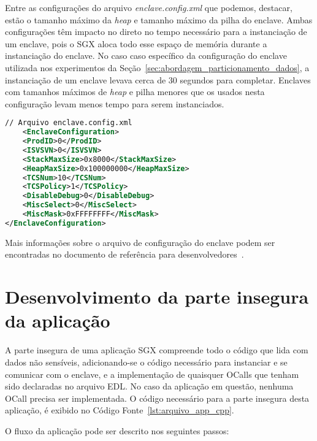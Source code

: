Entre as configurações do arquivo \textit{enclave.config.xml} que podemos,
destacar, estão o tamanho máximo da \textit{heap} e tamanho máximo da pilha do
enclave. Ambas configurações têm impacto no direto no tempo necessário para a
instanciação de um enclave, pois o SGX aloca todo esse espaço de memória durante
a instanciação do enclave. No caso caso específico da configuração do enclave
utilizada nos experimentos da Seção~\ref{sec:abordagem_particionamento_dados},
a instanciação de um enclave levava cerca de 30 segundos para completar.
Enclaves com tamanhos máximos de \textit{heap} e pilha menores que os usados
nesta configuração levam menos tempo para serem instanciados.

\newpage
\begin{lstlisting}[language=XML, label=lst:arquivo_enclave_config_xml, caption={Arquivo
de configuração do enclave SGX.}]
    // Arquivo enclave.config.xml
    <EnclaveConfiguration>
    <ProdID>0</ProdID>
    <ISVSVN>0</ISVSVN>
    <StackMaxSize>0x8000</StackMaxSize>
    <HeapMaxSize>0x100000000</HeapMaxSize>
    <TCSNum>10</TCSNum>
    <TCSPolicy>1</TCSPolicy>
    <DisableDebug>0</DisableDebug>
    <MiscSelect>0</MiscSelect>
    <MiscMask>0xFFFFFFFF</MiscMask>
</EnclaveConfiguration>
\end{lstlisting}

Mais informações sobre o arquivo de configuração do enclave podem ser
encontradas no documento de referência para desenvolvedores~\cite
{sgxdeveloperreference}.

\section{Desenvolvimento da parte insegura da aplicação}
\label{sec:appendix_aplicacao_sgx_parte_insegura}

A parte insegura de uma aplicação SGX compreende todo o código que lida com
dados não sensíveis, adicionando-se o código necessário para instanciar e se
comunicar com o enclave, e a implementação de quaisquer OCalls que tenham sido
declaradas no arquivo EDL. No caso da aplicação em questão, nenhuma OCall
precisa ser implementada. O código necessário para a parte insegura desta
aplicação, é exibido no Código Fonte~\ref{lst:arquivo_app_cpp}.

O fluxo da aplicação pode ser descrito nos seguintes passos:


